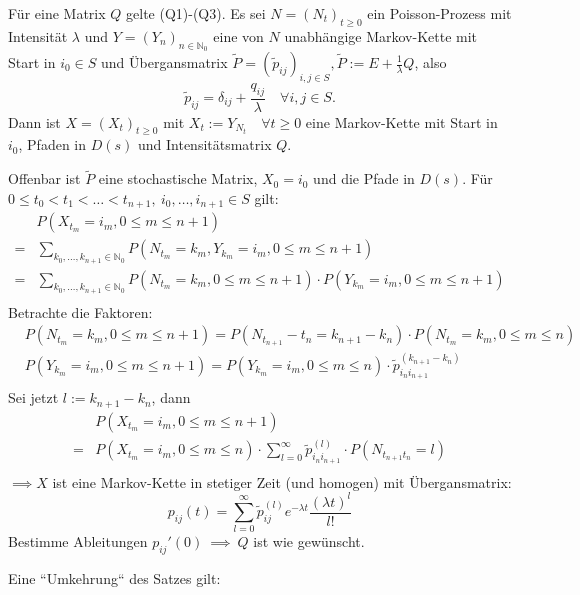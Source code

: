 \documentclass[a4paper,twoside,DIV15,BCOR12mm]{scrbook}
\begin{document}
  \begin{satz}
    \label{Satz 8.4}
    Für eine Matrix $Q$ gelte (Q1)-(Q3). Es sei $N=(N_t)_{t\geq0}$ ein Poisson-Prozess mit
    Intensität $\lambda$ und $Y=(Y_n)_{n\in\mathbb N_0}$ eine von $N$ unabhängige Markov-Kette
    mit Start in $i_0\in S$ und Übergansmatrix $\tilde{P}=(\tilde{p}_{ij})_{i,j\in S},
    \tilde{P}:=E+\frac{1}{\lambda}Q$, also
    \[
    \tilde{p}_{ij}=\delta_{ij}+\frac{q_{ij}}{\lambda} \quad \forall i,j\in S.
    \]
    Dann ist $X=(X_t)_{t\geq0}$ mit $X_t:=Y_{N_t} \quad\forall t\geq0$ eine Markov-Kette
    mit Start in $i_0$, Pfaden in $D(s)$ und Intensitätsmatrix $Q$.
  \end{satz}
  \begin{beweis}
    Offenbar ist $\tilde{P}$ eine stochastische Matrix, $X_0=i_0$ und die Pfade in $D(s)$.
    Für $0\leq t_0<t_1<\dots<t_{n+1}, \ i_0,\dots,i_{n+1}\in S$ gilt:
    \begin{align*}
      & P(X_{t_m}=i_m,0\leq m\leq n+1) \\
      =& \sum_{k_0,\dots,k_{n+1}\in\mathbb N_0} P(N_{t_m}=k_m, Y_{k_m}=i_m, 0\leq m\leq n+1) \\
      =& \sum_{k_0,\dots,k_{n+1}\in\mathbb N_0} P(N_{t_m}=k_m, 0\leq m\leq n+1)\cdot P(Y_{k_m}=i_m, 0\leq m\leq n+1) \\
    \end{align*}
    Betrachte die Faktoren:
    \begin{align*}
      & P(N_{t_m}=k_m, 0\leq m\leq n+1)=P(N_{t_{n+1}}-t_n=k_{n+1}-k_n)\cdot P(N_{t_m}=k_m, 0\leq m \leq n) \\
      & P(Y_{k_m}=i_m, 0\leq m \leq n+1) = P(Y_{k_m}=i_m, 0\leq m \leq n) \cdot \tilde{p}_{i_ni_{n+1}}^{(k_{n+1}-k_n)} \\
    \end{align*}
    Sei jetzt $l:=k_{n+1}-k_n$, dann
    \begin{align*}
      & P(X_{t_m}=i_m, 0\leq m \leq n+1) \\ 
      =& P(X_{t_m}=i_m, 0\leq m \leq n)\cdot \sum_{l=0}^\infty \tilde{p}_{i_ni_{n+1}}^{(l)} \cdot P(N_{t_{n+1}t_n}=l) \\
    \end{align*}
    $\implies X$ ist eine Markov-Kette in stetiger Zeit (und homogen) mit Übergansmatrix:
    \[
    p_{ij}(t)=\sum_{l=0}^\infty\tilde{p}_{ij}^{(l)}e^{-\lambda t} \frac{(\lambda t)^l}{l!}
    \]
    Bestimme Ableitungen $p_{ij}'(0) \ \implies \ Q$ ist wie gewünscht.
  \end{beweis}
  Eine ``Umkehrung`` des Satzes gilt: \\
\end{document}
